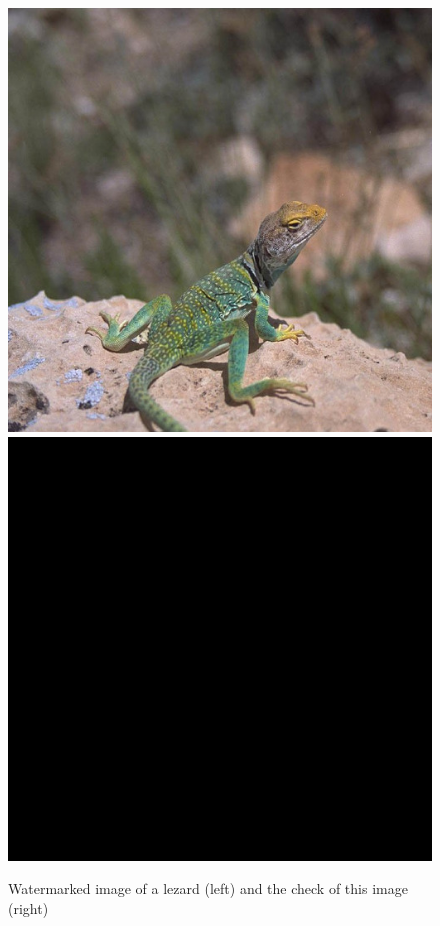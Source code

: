 \documentclass[11pt, oneside]{article}   	%
\begin{document}
\newpage
			\begin{figure}[h]
			\begin{center}
				\includegraphics[scale=0.35]{images_png/image3.jpg}
				\includegraphics[scale=0.35]{images_png/image5.jpg}
			\end{center}
			\caption{Watermarked image of a lezard (left) and the check of this image (right)}
			\end{figure}
		
\end{document}

